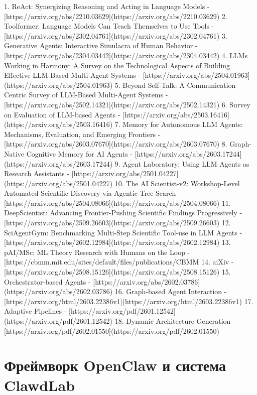 1. ReAct: Synergizing Reasoning and Acting in Language Models - [https://arxiv.org/abs/2210.03629](https://arxiv.org/abs/2210.03629)
2. Toolformer: Language Models Can Teach Themselves to Use Tools - [https://arxiv.org/abs/2302.04761](https://arxiv.org/abs/2302.04761)
3. Generative Agents: Interactive Simulacra of Human Behavior - [https://arxiv.org/abs/2304.03442](https://arxiv.org/abs/2304.03442)
4. LLMs Working in Harmony: A Survey on the Technological Aspects of Building Effective LLM-Based Multi Agent Systems - [https://arxiv.org/abs/2504.01963](https://arxiv.org/abs/2504.01963)
5. Beyond Self-Talk: A Communication-Centric Survey of LLM-Based Multi-Agent Systems - [https://arxiv.org/abs/2502.14321](https://arxiv.org/abs/2502.14321)
6. Survey on Evaluation of LLM-based Agents - [https://arxiv.org/abs/2503.16416](https://arxiv.org/abs/2503.16416)
7. Memory for Autonomous LLM Agents: Mechanisms, Evaluation, and Emerging Frontiers - [https://arxiv.org/abs/2603.07670](https://arxiv.org/abs/2603.07670)
8. Graph-Native Cognitive Memory for AI Agents - [https://arxiv.org/abs/2603.17244](https://arxiv.org/abs/2603.17244)
9. Agent Laboratory: Using LLM Agents as Research Assistants - [https://arxiv.org/abs/2501.04227](https://arxiv.org/abs/2501.04227)
10. The AI Scientist-v2: Workshop-Level Automated Scientific Discovery via Agentic Tree Search - [https://arxiv.org/abs/2504.08066](https://arxiv.org/abs/2504.08066)
11. DeepScientist: Advancing Frontier-Pushing Scientific Findings Progressively - [https://arxiv.org/abs/2509.26603](https://arxiv.org/abs/2509.26603)
12. SciAgentGym: Benchmarking Multi-Step Scientific Tool-use in LLM Agents - [https://arxiv.org/abs/2602.12984](https://arxiv.org/abs/2602.12984)
13. pAI/MSc: ML Theory Research with Humans on the Loop - [https://cbmm.mit.edu/sites/default/files/publications/CBMM%
14. aiXiv - [https://arxiv.org/abs/2508.15126](https://arxiv.org/abs/2508.15126)
15. Orchestrator-based Agents - [https://arxiv.org/abs/2602.03786](https://arxiv.org/abs/2602.03786)
16. Graph-based Agent Interaction - [https://arxiv.org/html/2603.22386v1](https://arxiv.org/html/2603.22386v1)
17. Adaptive Pipelines - [https://arxiv.org/pdf/2601.12542](https://arxiv.org/pdf/2601.12542)
18. Dynamic Architecture Generation - [https://arxiv.org/pdf/2602.01550](https://arxiv.org/pdf/2602.01550)


\section{Фреймворк OpenClaw и система ClawdLab}


